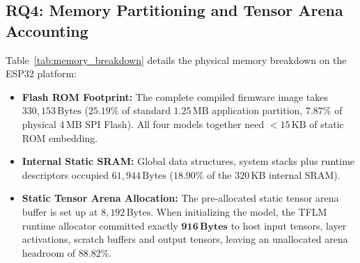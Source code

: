 \documentclass[journal,10pt]{IEEEtran}
\begin{document}
\begin{table}[t]
\centering
\footnotesize
\renewcommand{\arraystretch}{0.92}
\caption{Complete Physical Memory Subsystem Breakdown on ESP32-D0WD-V3}
\label{tab:memory_breakdown}
\end{table}

\subsection{RQ4: Memory Partitioning and Tensor Arena Accounting}
Table~\ref{tab:memory_breakdown} details the physical memory breakdown on the ESP32 platform:
\begin{itemize}
    \item \textbf{Flash ROM Footprint:} The complete compiled firmware image takes $330,153\,\text{Bytes}$ ($25.19\%$ of standard $1.25\,\text{MB}$ application partition, $7.87\%$ of physical $4\,\text{MB}$ SPI Flash). All four models together need $< 15\,\text{KB}$ of static ROM embedding.
    \item \textbf{Internal Static SRAM:} Global data structures, system stacks plus runtime descriptors occupied $61,944\,\text{Bytes}$ ($18.90\%$ of the $320\,\text{KB}$ internal SRAM).
    \item \textbf{Static Tensor Arena Allocation:} The pre-allocated static tensor arena buffer is set up at $8,192\,\text{Bytes}$. When initializing the model, the TFLM runtime allocator committed exactly $\mathbf{916\,\text{Bytes}}$ to host input tensors, layer activations, scratch buffers and output tensors, leaving an unallocated arena headroom of $\mathbf{88.82\%}$.
\end{itemize}
\end{document}
